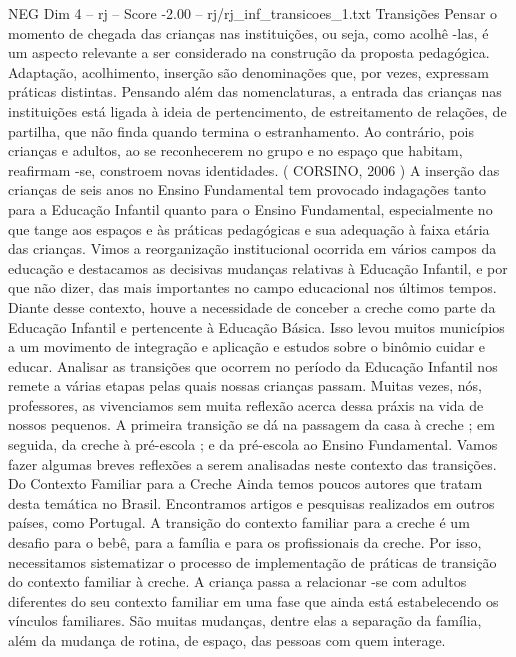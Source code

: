 \begin{textsample}{NEG Dim 4 – rj – Score -2.00 – rj/rj\_inf\_transicoes\_1.txt}  \label{ex:f4_neg_122}
Transições Pensar o momento de chegada das crianças nas instituições, ou seja, como acolhê -las, é um aspecto relevante a ser considerado na construção da proposta pedagógica.
Adaptação, acolhimento, inserção são denominações que, por vezes, expressam práticas distintas.
Pensando além das nomenclaturas, a entrada das crianças nas instituições está ligada à ideia de pertencimento, de estreitamento de relações, de partilha, que não finda quando termina o estranhamento.
Ao contrário, pois crianças e adultos, ao se reconhecerem no grupo e no espaço que habitam, reafirmam -se, constroem novas identidades. ( CORSINO, 2006 ) A inserção das crianças de seis anos no Ensino Fundamental tem provocado indagações tanto para a Educação Infantil quanto para o Ensino Fundamental, especialmente no que tange aos espaços e às práticas pedagógicas e sua adequação à faixa etária das crianças.
Vimos a reorganização institucional ocorrida em vários campos da educação e destacamos as decisivas mudanças relativas à Educação Infantil, e por que não dizer, das mais importantes no campo educacional nos últimos tempos.
Diante desse contexto, houve a necessidade de conceber a creche como parte da Educação Infantil e pertencente à Educação Básica.
Isso levou muitos municípios a um movimento de integração e aplicação e estudos sobre o binômio cuidar e educar.
Analisar as transições que ocorrem no período da Educação Infantil nos remete a várias etapas pelas quais nossas crianças passam.
Muitas vezes, nós, professores, as vivenciamos sem muita reflexão acerca dessa práxis na vida de nossos pequenos.
A primeira transição se dá na passagem da casa à creche ; em seguida, da creche à pré-escola ; e da pré-escola ao Ensino Fundamental.
Vamos fazer algumas breves reflexões a serem analisadas neste contexto das transições.
Do Contexto Familiar para a Creche Ainda temos poucos autores que tratam desta temática no Brasil.
Encontramos artigos e pesquisas realizados em outros países, como Portugal.
A transição do contexto familiar para a creche é um desafio para o bebê, para a família e para os profissionais da creche.
Por isso, necessitamos sistematizar o processo de implementação de práticas de transição do contexto familiar à creche.
A criança passa a relacionar -se com adultos diferentes do seu contexto familiar em uma fase que ainda está estabelecendo os vínculos familiares.
São muitas mudanças, dentre elas a separação da família, além da mudança de rotina, de espaço, das pessoas com quem interage.

\end{textsample}
